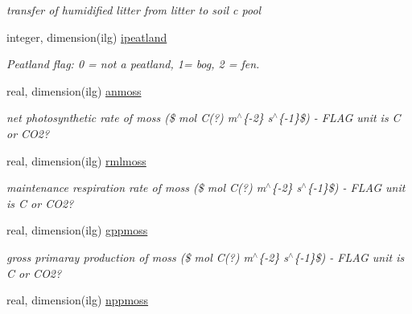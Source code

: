 \begin{DoxyCompactItemize}
\begin{DoxyCompactList}\small\item\em transfer of humidified litter from litter to soil c pool \end{DoxyCompactList}\item 
\hypertarget{structctem__statevars_1_1veg__gat_a31638701bf8be635918566d4f57d3b63}{}integer, dimension(ilg) \hyperlink{structctem__statevars_1_1veg__gat_a31638701bf8be635918566d4f57d3b63}{ipeatland}\label{structctem__statevars_1_1veg__gat_a31638701bf8be635918566d4f57d3b63}

\begin{DoxyCompactList}\small\item\em Peatland flag\+: 0 = not a peatland, 1= bog, 2 = fen. \end{DoxyCompactList}\item 
\hypertarget{structctem__statevars_1_1veg__gat_ae69e36cf6928e8c9dca33c8313decafe}{}real, dimension(ilg) \hyperlink{structctem__statevars_1_1veg__gat_ae69e36cf6928e8c9dca33c8313decafe}{anmoss}\label{structctem__statevars_1_1veg__gat_ae69e36cf6928e8c9dca33c8313decafe}

\begin{DoxyCompactList}\small\item\em net photosynthetic rate of moss (\$ mol C(?) m$^\wedge$\{-\/2\} s$^\wedge$\{-\/1\}\$) -\/ F\+L\+A\+G unit is C or C\+O2? \end{DoxyCompactList}\item 
\hypertarget{structctem__statevars_1_1veg__gat_ad6f99989dfd17eee75af3d6c79890339}{}real, dimension(ilg) \hyperlink{structctem__statevars_1_1veg__gat_ad6f99989dfd17eee75af3d6c79890339}{rmlmoss}\label{structctem__statevars_1_1veg__gat_ad6f99989dfd17eee75af3d6c79890339}

\begin{DoxyCompactList}\small\item\em maintenance respiration rate of moss (\$ mol C(?) m$^\wedge$\{-\/2\} s$^\wedge$\{-\/1\}\$) -\/ F\+L\+A\+G unit is C or C\+O2? \end{DoxyCompactList}\item 
\hypertarget{structctem__statevars_1_1veg__gat_aceeddbe4e65540b7bb1e2e5033762023}{}real, dimension(ilg) \hyperlink{structctem__statevars_1_1veg__gat_aceeddbe4e65540b7bb1e2e5033762023}{gppmoss}\label{structctem__statevars_1_1veg__gat_aceeddbe4e65540b7bb1e2e5033762023}

\begin{DoxyCompactList}\small\item\em gross primaray production of moss (\$ mol C(?) m$^\wedge$\{-\/2\} s$^\wedge$\{-\/1\}\$) -\/ F\+L\+A\+G unit is C or C\+O2? \end{DoxyCompactList}\item 
\hypertarget{structctem__statevars_1_1veg__gat_a15e2b67027c0873f207c8322f0b7a67e}{}real, dimension(ilg) \hyperlink{structctem__statevars_1_1veg__gat_a15e2b67027c0873f207c8322f0b7a67e}{nppmoss}\label{structctem__statevars_1_1veg__gat_a15e2b67027c0873f207c8322f0b7a67e}


\end{DoxyCompactItemize}
